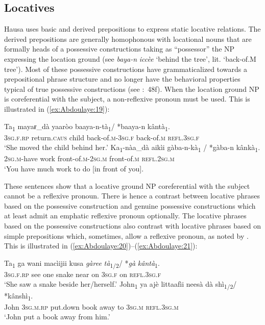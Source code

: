 \documentclass[output=paper]{langscibook}
\begin{document}
\subsection{Locatives} \label{sec:Abdoulaye:4.3}

Hausa uses basic and derived prepositions to express static locative relations. The derived prepositions are generally homophonous with locational nouns that are formally heads of a possessive constructions taking as “possessor” the NP expressing the location ground (see \textit{baya\nobreakdash-n} \textit{iccèe} ‘behind the tree’, lit. ‘back-of.M tree’). Most of these possessive constructions have grammaticalized towards a prepositional phrase structure and no longer have the behavioral properties typical of true possessive constructions (see \citealt{Abdoulaye2018}:~48f). When the location ground NP is coreferential with the subject, a non-reflexive pronoun must be used. This is illustrated in (\ref{ex:Abdoulaye:19}):


\ea%
    \label{ex:Abdoulaye:19}
    \ea \label{ex:Abdoulaye:19a}
    \gll Ta\textsubscript{1}  mayaɍ\_dà  yaaròo  baaya-n-tà\textsubscript{1}/  *baaya-n  kântà\textsubscript{1}.\\
    \textsc{3sg.f.rp}  return.\textsc{caus}  child  back-of.\textsc{m-3sg.f}  back-of.\textsc{m}  \textsc{refl.3sg.f}\\
    \glt `She moved the child behind her.’
    \ex \label{ex:Abdoulaye:19b}
    \gll Ka\textsubscript{1}{}-nàa\_dà  aikìi  gàba-n-kà\textsubscript{1} /  *gàba-n  kânkà\textsubscript{1}.\\
    \textsc{2sg.m}-have  work  front-of.\textsc{m-2sg.m} { } front-of.\textsc{m}  \textsc{refl.2sg.m}\\
    \glt `You have much work to do [in front of you].
    \z
\z


These sentences show that a locative ground NP coreferential with the subject cannot be a reflexive pronoun. There is hence a contrast between locative phrases based on the possessive construction and genuine possessive constructions which at least admit an emphatic reflexive pronoun optionally. The locative phrases based on the possessive constructions also contrast with locative phrases based on simple prepositions which, sometimes, allow a reflexive pronoun, as noted by \citet[522f]{Newman2000}. This is illustrated in (\ref{ex:Abdoulaye:20})--(\ref{ex:Abdoulaye:21}):


\ea%
    \label{ex:Abdoulaye:20}
    \ea  \label{ex:Abdoulaye:20a}
    \gll  Ta\textsubscript{1} ga  wani  macìijii  kusa  \textit{gàree}  \textit{tà}\textsubscript{1/2}/  *\textit{gà}  \textit{kântà}\textsubscript{1}.\\
    \textsc{3sg.f.rp}  see  one  snake  near  on  \textsc{3sg.f}  on  \textsc{refl.3sg.f}\\
     \glt  `She saw a snake beside her/herself.’
    \ex  \label{ex:Abdoulaye:20b}
    \gll John\textsubscript{1} ya  ajè  littaafìi  neesà  dà  shì\textsubscript{1/2}/  *kânshì\textsubscript{1}.\\
    John  \textsc{3sg.m.rp}  put.down  book  away  to  \textsc{3sg.m}  \textsc{refl.3sg.m}\\
    \glt    `John put a book away from him.’
    \z
\z
\end{document}
